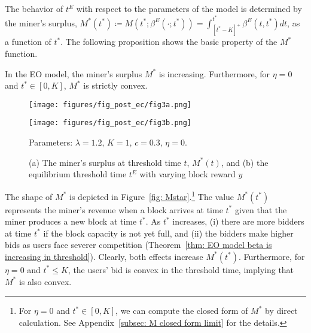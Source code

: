 \documentclass[12pt, letterpaper]{article}
\begin{document}
The behavior of $t^E$ with respect to the parameters of the model is determined by the miner's surplus, $M^*(t^*) \coloneqq M(t^*; \beta^E(\cdot; t^*)) = \int_{[t^* - K]^+}^{t^*}\beta^E(t, t^*) dt$, as a function of $t^*$. The following proposition shows the basic property of the $M^*$ function.

\begin{prop}\label{thm: comparative statics M}
    In the EO model, the miner's surplus $M^*$ is increasing. Furthermore, for $\eta = 0$ and $t^* \in [0, K]$, $M^*$ is strictly convex.
\end{prop}

\begin{figure}[tb]
    \centering
    \begin{minipage}[t]{0.475\textwidth}
        \centering
        \texttt{[image: figures/fig\_post\_ec/fig3a.png]}
        \label{fig: Mstar}
    \end{minipage}
    \hfill
    \begin{minipage}[t]{0.475\textwidth}  
        \centering 
        \texttt{[image: figures/fig\_post\_ec/fig3b.png]}
        \label{fig: tE}
    \end{minipage}
    \caption{(a) The miner's surplus at threshold time $t$, $M^*(t)$, and (b) the equilibrium threshold time $t^E$ with varying block reward $y$}
    \label{fig: Mstar and tE}
    \begin{center}\footnotesize
        Parameters: $\lambda = 1.2$, $K = 1$, $c = 0.3$, $\eta = 0$. 
    \end{center}
\end{figure}


The shape of $M^*$ is depicted in Figure~\ref{fig: Mstar}.\footnote{For $\eta = 0$ and $t^* \in [0, K]$, we can compute the closed form of $M^*$ by direct calculation. See Appendix~\ref{subsec: M closed form limit} for the details.} The value $M^*(t^*)$ represents the miner's revenue when a block arrives at time $t^*$ given that the miner produces a new block at time $t^*$. As $t^*$ increases, (i) there are more bidders at time $t^*$ if the block capacity is not yet full, and (ii) the bidders make higher bids as users face severer competition (Theorem~\ref{thm: EO model beta is increasing in threshold}). Clearly, both effects increase $M^*(t^*)$. Furthermore, for $\eta = 0$ and $t^* \le K$, the users' bid is convex in the threshold time, implying that $M^*$ is also convex.
\end{document}
